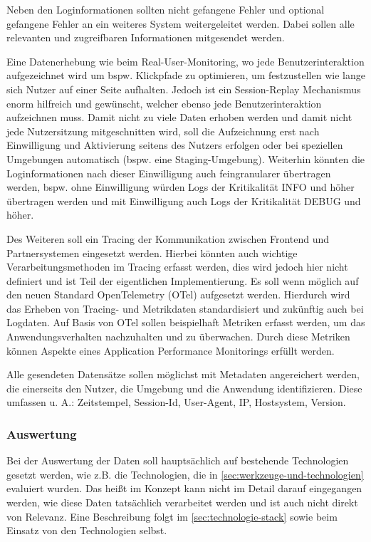 	Neben den Loginformationen sollten nicht gefangene Fehler und optional gefangene Fehler an ein weiteres System weitergeleitet werden. Dabei sollen alle relevanten und zugreifbaren Informationen mitgesendet werden.
		
	Eine Datenerhebung wie beim Real-User-Monitoring, wo jede Benutzerinteraktion aufgezeichnet wird um bspw. Klickpfade zu optimieren, um festzustellen wie lange sich Nutzer auf einer Seite aufhalten. Jedoch ist ein Session-Replay Mechanismus enorm hilfreich und gewünscht, welcher ebenso jede Benutzerinteraktion aufzeichnen muss. Damit nicht zu viele Daten erhoben werden und damit nicht jede Nutzersitzung mitgeschnitten wird, soll die Aufzeichnung erst nach Einwilligung und Aktivierung seitens des Nutzers erfolgen oder bei speziellen Umgebungen automatisch (bspw. eine Staging-Umgebung). Weiterhin könnten die Loginformationen nach dieser Einwilligung auch feingranularer übertragen werden, bspw. ohne Einwilligung würden Logs der Kritikalität INFO und höher übertragen werden und mit Einwilligung auch Logs der Kritikalität DEBUG und höher.
		
	Des Weiteren soll ein Tracing der Kommunikation zwischen Frontend und Partnersystemen eingesetzt werden. Hierbei könnten auch wichtige Verarbeitungsmethoden im Tracing erfasst werden, dies wird jedoch hier nicht definiert und ist Teil der eigentlichen Implementierung. Es soll wenn möglich auf den neuen Standard OpenTelemetry (OTel) aufgesetzt werden. Hierdurch wird das Erheben von Tracing- und Metrikdaten standardisiert und zukünftig auch bei Logdaten. Auf Basis von OTel sollen beispielhaft Metriken erfasst werden, um das Anwendungsverhalten nachzuhalten und zu überwachen. Durch diese Metriken können Aspekte eines Application Performance Monitorings erfüllt werden.
		
	Alle gesendeten Datensätze sollen möglichst mit Metadaten angereichert werden, die einerseits den Nutzer, die Umgebung und die Anwendung identifizieren. Diese umfassen u. A.: Zeitstempel, Session-Id, User-Agent, IP, Hostsystem, Version.
		
	\subsubsection{Auswertung}
		
	Bei der Auswertung der Daten soll hauptsächlich auf bestehende Technologien gesetzt werden, wie z.B. die Technologien, die in \autoref{sec:werkzeuge-und-technologien} evaluiert wurden. Das heißt im Konzept kann nicht im Detail darauf eingegangen werden, wie diese Daten tatsächlich verarbeitet werden und ist auch nicht direkt von Relevanz. Eine Beschreibung folgt im \autoref{sec:technologie-stack} sowie beim Einsatz von den Technologien selbst.
		
